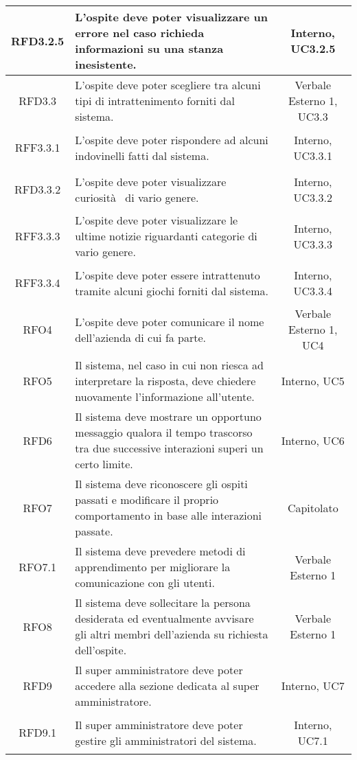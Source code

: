 \begin{longtable}{|c|>{\centering}m{7cm}|c|}
\hypertarget{RFD3.2.5}{RFD3.2.5} & L'ospite deve poter visualizzare un errore nel caso richieda informazioni su una stanza inesistente. & Interno, UC3.2.5\\ \hline
\hypertarget{RFD3.3}{RFD3.3} & L'ospite deve poter scegliere tra alcuni tipi di intrattenimento forniti dal sistema. & Verbale Esterno 1, UC3.3\\ \hline
\hypertarget{RFF3.3.1}{RFF3.3.1} & L'ospite deve poter rispondere ad alcuni indovinelli fatti dal sistema. & Interno, UC3.3.1\\ \hline
\hypertarget{RFD3.3.2}{RFD3.3.2} & L'ospite deve poter visualizzare curiosità  di vario genere. & Interno, UC3.3.2\\ \hline
\hypertarget{RFF3.3.3}{RFF3.3.3} & L'ospite deve poter visualizzare le ultime notizie riguardanti categorie di vario genere. & Interno, UC3.3.3\\ \hline
\hypertarget{RFF3.3.4}{RFF3.3.4} & L'ospite deve poter essere intrattenuto tramite alcuni giochi forniti dal sistema. & Interno, UC3.3.4\\ \hline
\hypertarget{RFO4}{RFO4} & L'ospite deve poter comunicare il nome dell'azienda di cui fa parte. & Verbale Esterno 1, UC4\\ \hline
\hypertarget{RFO5}{RFO5} & Il sistema, nel caso in cui non riesca ad interpretare la risposta, deve chiedere nuovamente l'informazione all'utente. & Interno, UC5\\ \hline
\hypertarget{RFD6}{RFD6} & Il sistema deve mostrare un opportuno messaggio qualora il tempo trascorso tra due successive interazioni superi un certo limite. & Interno, UC6\\ \hline
\hypertarget{RFO7}{RFO7} & Il sistema deve riconoscere gli ospiti passati e modificare il proprio comportamento in base alle interazioni passate. & Capitolato\\ \hline
\hypertarget{RFO7.1}{RFO7.1} & Il sistema deve prevedere metodi di apprendimento per migliorare la comunicazione con gli utenti. & Verbale Esterno 1\\ \hline
\hypertarget{RFO8}{RFO8} & Il sistema deve sollecitare la persona desiderata ed eventualmente avvisare gli altri membri dell'azienda su richiesta dell'ospite. & Verbale Esterno 1\\ \hline
\hypertarget{RFD9}{RFD9} & Il super amministratore deve poter accedere alla sezione dedicata al super amministratore. & Interno, UC7\\ \hline
\hypertarget{RFD9.1}{RFD9.1} & Il super amministratore deve poter gestire gli amministratori del sistema. & Interno, UC7.1\\ \hline

\end{longtable}
